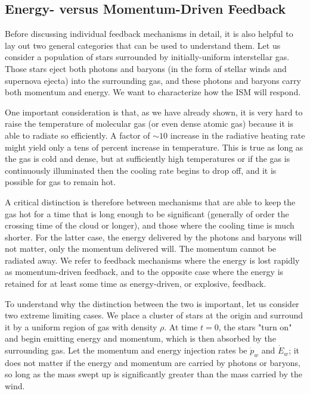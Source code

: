 \subsection{Energy- versus Momentum-Driven Feedback}

Before discussing individual feedback mechanisms in detail, it is also helpful to lay out two general categories that can be used to understand them. Let us consider a population of stars surrounded by initially-uniform interstellar gas. Those stars eject both photons and baryons (in the form of stellar winds and supernova ejecta) into the surrounding gas, and these photons and baryons carry both momentum and energy. We want to characterize how the ISM will respond.

One important consideration is that, as we have already shown, it is very hard to raise the temperature of molecular gas (or even dense atomic gas) because it is able to radiate so efficiently. A factor of $\sim 10$ increase in the radiative heating rate might yield only a tens of percent increase in temperature. This is true as long as the gas is cold and dense, but at sufficiently high temperatures or if the gas is continuously illuminated then the cooling rate begins to drop off, and it is possible for gas to remain hot.

A critical distinction is therefore between mechanisms that are able to keep the gas hot for a time that is long enough to be significant (generally of order the crossing time of the cloud or longer), and those where the cooling time is much shorter. For the latter case, the energy delivered by the photons and baryons will not matter, only the momentum delivered will. The momentum cannot be radiated away. We refer to feedback mechanisms where the energy is lost rapidly as momentum-driven feedback, and to the opposite case where the energy is retained for at least some time as energy-driven, or explosive, feedback.

To understand why the distinction between the two is important, let us consider two extreme limiting cases. We place a cluster of stars at the origin and surround it by a uniform region of gas with density $\rho$. At time $t=0$, the stars "turn on" and begin emitting energy and momentum, which is then absorbed by the surrounding gas. Let the momentum and energy injection rates be $\dot{p}_w$ and $\dot{E}_w$; it does not matter if the energy and momentum are carried by photons or baryons, so long as the mass swept up is significantly greater than the mass carried by the wind.

